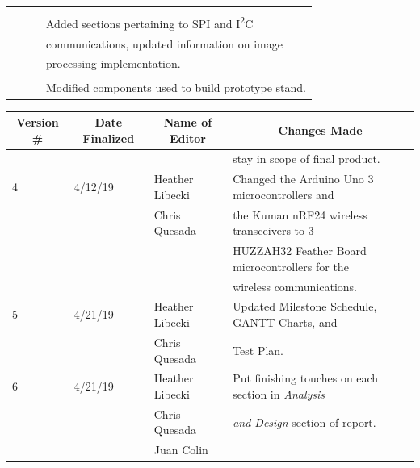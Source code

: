 \begin{table} [H]
\begin{tabular}{|l|l|l|l|}
 	      &         		 &              			   & \\
 	      &         		 &               			   & Added sections pertaining to SPI and I\textsuperscript{2}C \\
 	      &         		 &              			   & communications, updated information on image \\
 	      &        		 &                 			   &  processing implementation. \\
 	      &         		 &               			   & \\
 	      &         		 &              			   & Modified components used to build prototype stand. \\
		\hline
\end{tabular} 
\end{table} 	
\thispagestyle{empty}      
\begin{table} [H]	
	\normalsize
	\centering
	\begin{tabular}{|l|l|l|l|}
		\hline
		\multicolumn{1}{|c|}{\textbf{Version \#}} & 
		\multicolumn{1}{|c|}{\textbf{Date Finalized}} &
		\multicolumn{1}{|c|}{\textbf{Name of Editor}} & 
		\multicolumn{1}{|c|}{\textbf{Changes Made}} \\
		\hline
 	    &          		 &                			   & stay in scope of final product.\\
 	      \hline
	 4 & 4/12/19  	 & Heather Libecki 		   & Changed the Arduino Uno 3 microcontrollers and  \\ 
	    &          		 & Chris Quesada   		   & the Kuman nRF24 wireless transceivers to 3  \\
	    &        		 &                 			   & HUZZAH32 Feather Board microcontrollers for the  \\ 	
	    &         		 &                			   & wireless communications.	\\      
 	      \hline
 	 5 & 4/21/19  	 & Heather Libecki		   & Updated Milestone Schedule, GANTT Charts, and \\ 
 	    &         		 & Chris Quesada  		   & Test Plan.	\\ 	
 	    \hline
 	 6 & 4/21/19  	 & Heather Libecki		   & Put finishing touches on each section in \textit{Analysis}\\ 
 	    &         		 & Chris Quesada  		   & \textit{and Design} section of report.\\
 	    &				 & Juan Colin			& \\
	      
		\hline
	\end{tabular} 
\end{table}
 \newpage
 \thispagestyle{empty}
